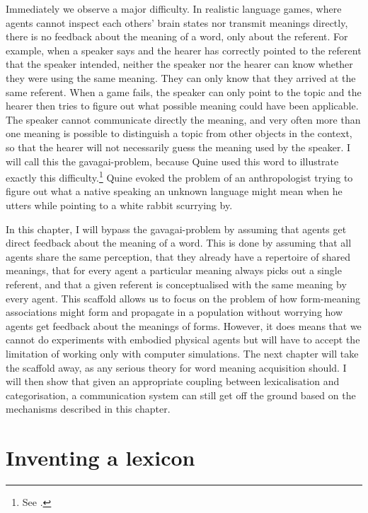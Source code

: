 Immediately we observe a major difficulty. In realistic
language games, where agents cannot inspect each others' 
brain states nor transmit meanings directly, 
there is no feedback about the 
meaning of a word, only about the referent. For example, 
when a speaker says  and the hearer has correctly pointed 
to the referent that the speaker intended, neither the 
speaker nor the hearer can know whether they were 
using the same meaning. They can only know that they 
arrived at the same referent. When a game fails, the speaker 
can only point to the topic and the hearer then 
tries to figure out what possible meaning 
could have been applicable. The speaker cannot
communicate directly the  meaning, and very often more 
than one meaning is possible to distinguish a topic from 
other objects in the context, so that the hearer will 
not necessarily guess the meaning used by the speaker. 
I will call this the gavagai-problem, because Quine 
used this word to illustrate exactly this difficulty.\footnote{See \cite[29--30]{Quine:1960}.}
Quine evoked the problem of an anthropologist
trying to figure out what a native speaking an unknown
language might mean when he utters  while pointing
to a white rabbit scurrying by. 

In this chapter, I will bypass the gavagai-problem by assuming
that agents get direct feedback about the meaning of a word. 
This is done by assuming that all agents share the 
same perception, that they already have
a repertoire of shared meanings, that for every agent
a particular meaning always picks out a single referent, and 
that a given referent is conceptualised with the same meaning 
by every agent. This scaffold allows us to focus on the problem
of how form-meaning associations might form and propagate in
a population without worrying how agents get feedback about 
the meanings of forms. However, it does means that we cannot 
do experiments with embodied physical agents but will have
to accept the limitation of working only
with computer simulations. 
The next chapter will take the scaffold 
away, as any serious theory for word meaning 
acquisition should. I will then show that given an 
appropriate coupling between lexicalisation and categorisation, 
a communication system can still get off the ground based on 
the mechanisms described in this chapter. 

\section{Inventing a lexicon}

